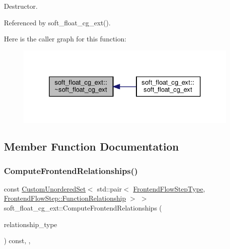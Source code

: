 Destructor. 



Referenced by soft\+\_\+float\+\_\+cg\+\_\+ext().

Here is the caller graph for this function\+:
\nopagebreak
\begin{figure}[H]
\begin{center}
\leavevmode
\includegraphics[width=312pt]{d2/db0/classsoft__float__cg__ext_a39ecc97f210f0a6d0afa7b75e046adde_icgraph}
\end{center}
\end{figure}


\subsection{Member Function Documentation}
\mbox{\label{classsoft__float__cg__ext_a52bc76adc5997ddea7031f84fbdd148e}} 
\subsubsection{\texorpdfstring{Compute\+Frontend\+Relationships()}{ComputeFrontendRelationships()}}
{\footnotesize\ttfamily const \hyperlink{classCustomUnorderedSet}{Custom\+Unordered\+Set}$<$ std\+::pair$<$ \hyperlink{frontend__flow__step_8hpp_afeb3716c693d2b2e4ed3e6d04c3b63bb}{Frontend\+Flow\+Step\+Type}, \hyperlink{classFrontendFlowStep_af7cf30f2023e5b99e637dc2058289ab0}{Frontend\+Flow\+Step\+::\+Function\+Relationship} $>$ $>$ soft\+\_\+float\+\_\+cg\+\_\+ext\+::\+Compute\+Frontend\+Relationships (\begin{DoxyParamCaption}\item[{const \hyperlink{classDesignFlowStep_a723a3baf19ff2ceb77bc13e099d0b1b7}{Design\+Flow\+Step\+::\+Relationship\+Type}}]{relationship\+\_\+type }\end{DoxyParamCaption}) const\hspace{0.3cm}{\ttfamily [override]}, {\ttfamily [protected]}, {\ttfamily [virtual]}}



